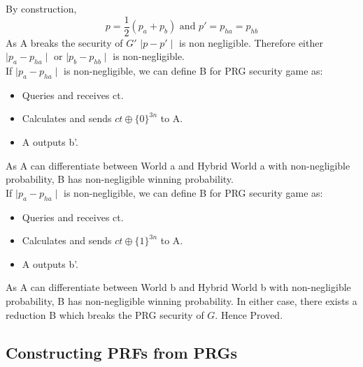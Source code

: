 \documentclass{article}
\begin{document}
By construction,
\[p=\frac{1}{2}(p_{a}+p_{b})\text{ and } p'=p_{ha}=p_{hb}\]
As A breaks the security of $G'$ $\mid p-p' \mid$ is non negligible. Therefore either $\mid p_{a}-p_{ha} \mid$ or $\mid p_{b}-p_{hb}\mid$ is non-negligible.\\
If $\mid p_{a}-p_{ha} \mid$ is non-negligible, we can define B for PRG security game as:
\begin{itemize}
    \item Queries and receives ct.
    \item Calculates and sends $ct\oplus\{0\}^{3n}$ to A.
    \item A outputs b'.
\end{itemize}
As A can differentiate between World a and Hybrid World a with non-negligible probability, B has non-negligible winning probability.\\
If $\mid p_{a}-p_{ha} \mid$ is non-negligible, we can define B for PRG security game as:
\begin{itemize}
    \item Queries and receives ct.
    \item Calculates and sends $ct\oplus\{1\}^{3n}$ to A.
    \item A outputs b'.
\end{itemize}
As A can differentiate between World b and Hybrid World b with non-negligible probability, B has non-negligible winning probability.
In either case, there exists a reduction B which breaks the PRG security of $G$. Hence Proved.
\newpage
\subsection{Constructing PRFs from PRGs}
\end{document}
